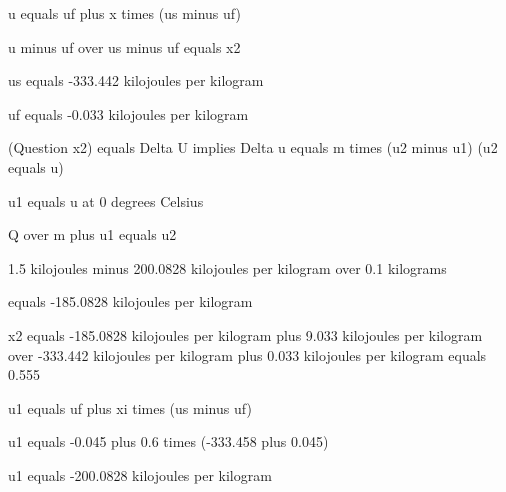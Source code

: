 u equals uf plus x times (us minus uf)

u minus uf over us minus uf equals x2

us equals -333.442 kilojoules per kilogram

uf equals -0.033 kilojoules per kilogram

(Question x2) equals Delta U implies Delta u equals m times (u2 minus u1) (u2 equals u)

u1 equals u at 0 degrees Celsius

Q over m plus u1 equals u2

1.5 kilojoules minus 200.0828 kilojoules per kilogram over 0.1 kilograms

equals -185.0828 kilojoules per kilogram

x2 equals -185.0828 kilojoules per kilogram plus 9.033 kilojoules per kilogram over -333.442 kilojoules per kilogram plus 0.033 kilojoules per kilogram equals 0.555

u1 equals uf plus xi times (us minus uf)

u1 equals -0.045 plus 0.6 times (-333.458 plus 0.045)

u1 equals -200.0828 kilojoules per kilogram